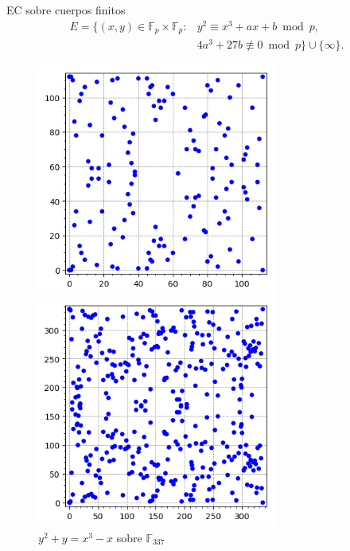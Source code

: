 \documentclass[12pt]{beamer}
\begin{document}
\begin{frame}[fragile]{EC sobre cuerpos finitos}
  \begin{align*}
    E = \{(x,y) \in  \mathbb{F}_p \times \mathbb{F}_p :& y^2 \equiv x^3 + ax +b \bmod p,\\
    & 4a^3+27b \not\equiv 0 \bmod p\} \cup \{\infty\}.
\end{align*}
  
  \begin{figure}[H]
	\centering
	\begin{minipage}[b]{0.45\textwidth}
	\centering
	\includegraphics[width=0.7\textwidth]{EC_F_113}
	\caption{$y^2 + y=x^3-x $ sobre $ \mathbb{F}_{113}$}
	\label{fig:ej5}
	\end{minipage}
	\begin{minipage}[b]{0.45\textwidth}
		\centering
	\includegraphics[width=0.7\textwidth]{EC_F_337}
	\caption{$y^2 + y=x^3-x $ sobre $ \mathbb{F}_{337} $}
	\label{fig:ej6}
	\end{minipage}
\end{figure}
\end{frame}
\end{document}
